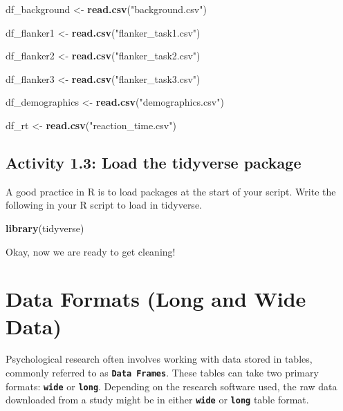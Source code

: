 \documentclass[
]{book}
\newenvironment{Shaded}{\begin{snugshade}}{\end{snugshade}}
\newcommand{\FunctionTok}[1]{\textcolor[rgb]{0.13,0.29,0.53}{\textbf{#1}}}
\newcommand{\NormalTok}[1]{#1}
\newcommand{\OtherTok}[1]{\textcolor[rgb]{0.56,0.35,0.01}{#1}}
\newcommand{\StringTok}[1]{\textcolor[rgb]{0.31,0.60,0.02}{#1}}
\begin{document}
\begin{Shaded}
\begin{Highlighting}[]
\NormalTok{df\_background }\OtherTok{\textless{}{-}} \FunctionTok{read.csv}\NormalTok{(}\StringTok{"background.csv"}\NormalTok{) }

\NormalTok{df\_flanker1 }\OtherTok{\textless{}{-}} \FunctionTok{read.csv}\NormalTok{(}\StringTok{"flanker\_task1.csv"}\NormalTok{)}

\NormalTok{df\_flanker2 }\OtherTok{\textless{}{-}} \FunctionTok{read.csv}\NormalTok{(}\StringTok{"flanker\_task2.csv"}\NormalTok{)}

\NormalTok{df\_flanker3 }\OtherTok{\textless{}{-}} \FunctionTok{read.csv}\NormalTok{(}\StringTok{"flanker\_task3.csv"}\NormalTok{)}

\NormalTok{df\_demographics }\OtherTok{\textless{}{-}} \FunctionTok{read.csv}\NormalTok{(}\StringTok{"demographics.csv"}\NormalTok{)}

\NormalTok{df\_rt }\OtherTok{\textless{}{-}} \FunctionTok{read.csv}\NormalTok{(}\StringTok{"reaction\_time.csv"}\NormalTok{)}
\end{Highlighting}
\end{Shaded}

\hypertarget{activity-1.3-load-the-tidyverse-package}{%
\subsection{Activity 1.3: Load the tidyverse package}\label{activity-1.3-load-the-tidyverse-package}}

A good practice in R is to load packages at the start of your script. Write the following in your R script to load in tidyverse.

\begin{Shaded}
\begin{Highlighting}[]
\FunctionTok{library}\NormalTok{(tidyverse)}
\end{Highlighting}
\end{Shaded}

Okay, now we are ready to get cleaning!

\hypertarget{data-formats-long-and-wide-data}{%
\section{Data Formats (Long and Wide Data)}\label{data-formats-long-and-wide-data}}

Psychological research often involves working with data stored in tables, commonly referred to as \textbf{\texttt{Data\ Frames}}. These tables can take two primary formats: \textbf{\texttt{wide}} or \textbf{\texttt{long}}. Depending on the research software used, the raw data downloaded from a study might be in either \textbf{\texttt{wide}} or \textbf{\texttt{long}} table format.
\end{document}
